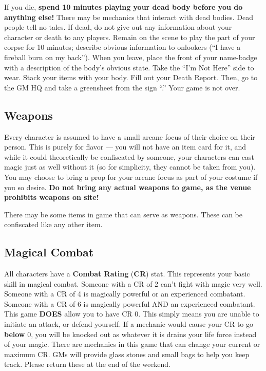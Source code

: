 \documentclass[sheet]{GL2020}
\begin{document}
If you die, \textbf{spend 10 minutes playing your dead body before you do anything else!} There may be mechanics that interact with dead bodies. Dead people tell no tales. If dead, do not give out any information about your character or death to any players. Remain on the scene to play the part of your corpse for 10 minutes; describe obvious information to onlookers (``I have a fireball burn on my back''). When you leave, place the front of your name-badge with a description of the body's obvious state. Take the ``I'm Not Here'' side to wear. Stack your items with your body. Fill out your Death Report. Then, go to the GM HQ and take a greensheet from the sign ``\sMurdered{}.'' Your game is not over. 

\subsection{Weapons}
Every character is assumed to have a small arcane focus of their choice on their person. This is purely for flavor — you will not have an item card for it, and while it could theoretically be confiscated by someone, your characters can cast magic just as well without it (so for simplicity, they cannot be taken from you). You may choose to bring a prop for your arcane focus as part of your costume if you so desire. \textbf{Do not bring any actual weapons to game, as the venue prohibits weapons on site!}

There may be some items in game that can serve as weapons. These can be confiscated like any other item.

\subsection{Magical Combat}
All characters have a {\bf Combat Rating} ({\bf CR}) stat. This represents your basic skill in magical combat. Someone with a CR of 2 can't fight with magic very well. Someone with a CR of 4 is magically powerful or an experienced combatant. Someone with a CR of 6 is magically powerful AND an experienced combatant. This game \textbf{DOES} allow you to have CR 0. This simply means you are unable to initiate an attack, or defend yourself. If a mechanic would cause your CR to go \textbf{below} 0, you will be knocked out as whatever it is drains your life force instead of your magic. There are mechanics in this game that can change your current or maximum CR. GMs will provide glass stones and small bags to help you keep track. Please return these at the end of the weekend.
\end{document}
